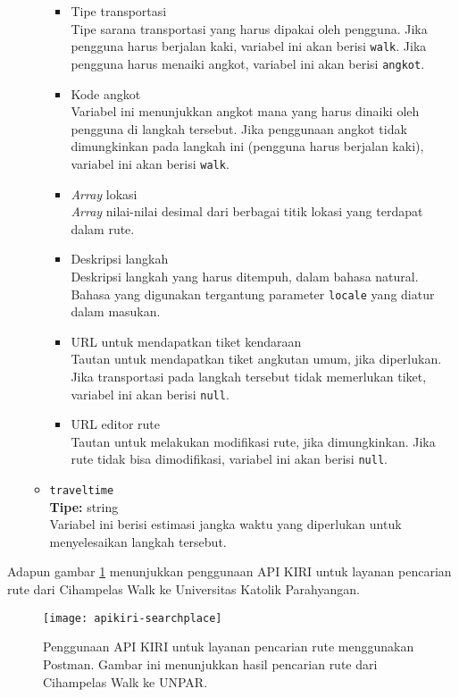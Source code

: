 \begin{itemize}
\begin{itemize}
		\begin{itemize}
			\item Tipe transportasi\\
			Tipe sarana transportasi yang harus dipakai oleh pengguna. Jika pengguna harus berjalan kaki, variabel ini akan berisi \verb|walk|. Jika pengguna harus menaiki angkot, variabel ini akan berisi \verb|angkot|.
			\item Kode angkot\\
			Variabel ini menunjukkan angkot mana yang harus dinaiki oleh pengguna di langkah tersebut. Jika penggunaan angkot tidak dimungkinkan pada langkah ini (pengguna harus berjalan kaki), variabel ini akan berisi \verb|walk|.
			\item \textit{Array} \latlon lokasi\\
			\textit{Array} nilai-nilai desimal \latlon dari berbagai titik lokasi yang terdapat dalam rute.
			\item Deskripsi langkah\\
			Deskripsi langkah yang harus ditempuh, dalam bahasa natural. Bahasa yang digunakan tergantung parameter \verb|locale| yang diatur dalam masukan.
			\item URL untuk mendapatkan tiket kendaraan\\
			Tautan untuk mendapatkan tiket angkutan umum, jika diperlukan. Jika transportasi pada langkah tersebut tidak memerlukan tiket, variabel ini akan berisi \verb|null|.
			\item URL editor rute\\
			Tautan untuk melakukan modifikasi rute, jika dimungkinkan. Jika rute tidak bisa dimodifikasi, variabel ini akan berisi \verb|null|.
		\end{itemize}
		
		\item \verb|traveltime|\\
		\textbf{Tipe:} string\\
		Variabel ini berisi estimasi jangka waktu yang diperlukan untuk menyelesaikan langkah tersebut.
	\end{itemize}
	
\end{itemize}
\vspace{\baselineskip}\noindent
Adapun gambar \ref{fig:kiri-api-routing-usage} menunjukkan penggunaan API KIRI untuk layanan pencarian rute dari Cihampelas Walk ke Universitas Katolik Parahyangan.

\begin{figure}[t]
    \centering
    \texttt{[image: apikiri-searchplace]}
    \caption[Penggunaan API KIRI untuk layanan pencarian rute]{Penggunaan API KIRI untuk layanan pencarian rute menggunakan Postman. Gambar ini menunjukkan hasil pencarian rute dari Cihampelas Walk ke UNPAR.}
    \label{fig:kiri-api-routing-usage}
\end{figure}

